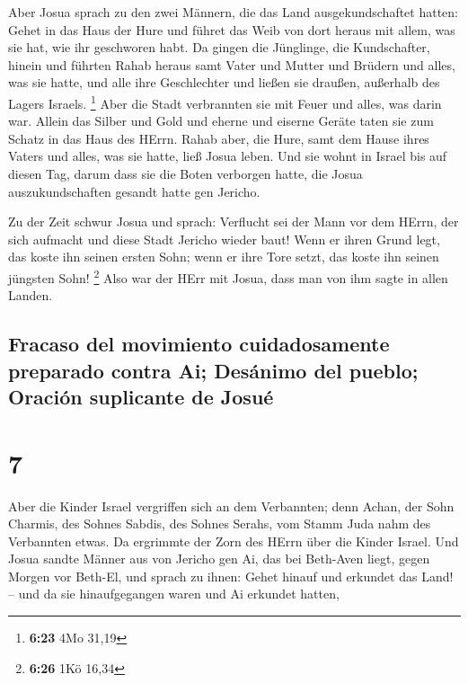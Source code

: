 Aber Josua sprach zu den zwei Männern, die das Land
ausgekundschaftet hatten: Gehet in das Haus der Hure und führet das Weib
von dort heraus mit allem, was sie hat, wie ihr geschworen habt.
 Da gingen die Jünglinge, die Kundschafter, hinein und
führten Rahab heraus samt Vater und Mutter und Brüdern und alles, was
sie hatte, und alle ihre Geschlechter und ließen sie draußen, außerhalb
des Lagers Israels. \footnote{\textbf{6:23} 4Mo 31,19} 
Aber die Stadt verbrannten sie mit Feuer und alles, was darin war.
Allein das Silber und Gold und eherne und eiserne Geräte taten sie zum
Schatz in das Haus des HErrn.  Rahab aber, die Hure, samt
dem Hause ihres Vaters und alles, was sie hatte, ließ Josua leben. Und
sie wohnt in Israel bis auf diesen Tag, darum dass sie die Boten
verborgen hatte, die Josua auszukundschaften gesandt hatte gen Jericho.

 Zu der Zeit schwur Josua und sprach: Verflucht sei der
Mann vor dem HErrn, der sich aufmacht und diese Stadt Jericho wieder
baut! Wenn er ihren Grund legt, das koste ihn seinen ersten Sohn; wenn
er ihre Tore setzt, das koste ihn seinen jüngsten Sohn! \footnote{\textbf{6:26}
  1Kö 16,34}  Also war der HErr mit Josua, dass man von
ihm sagte in allen Landen.

\hypertarget{fracaso-del-movimiento-cuidadosamente-preparado-contra-ai-desuxe1nimo-del-pueblo-oraciuxf3n-suplicante-de-josuuxe9}{%
\subsection{Fracaso del movimiento cuidadosamente preparado contra Ai;
Desánimo del pueblo; Oración suplicante de
Josué}\label{fracaso-del-movimiento-cuidadosamente-preparado-contra-ai-desuxe1nimo-del-pueblo-oraciuxf3n-suplicante-de-josuuxe9}}

\hypertarget{section-6}{%
\section{7}\label{section-6}}

 Aber die Kinder Israel vergriffen sich an dem Verbannten;
denn Achan, der Sohn Charmis, des Sohnes Sabdis, des Sohnes Serahs, vom
Stamm Juda nahm des Verbannten etwas. Da ergrimmte der Zorn des HErrn
über die Kinder Israel.  Und Josua sandte Männer aus von
Jericho gen Ai, das bei Beth-Aven liegt, gegen Morgen vor Beth-El, und
sprach zu ihnen: Gehet hinauf und erkundet das Land! -- und da sie
hinaufgegangen waren und Ai erkundet hatten,


